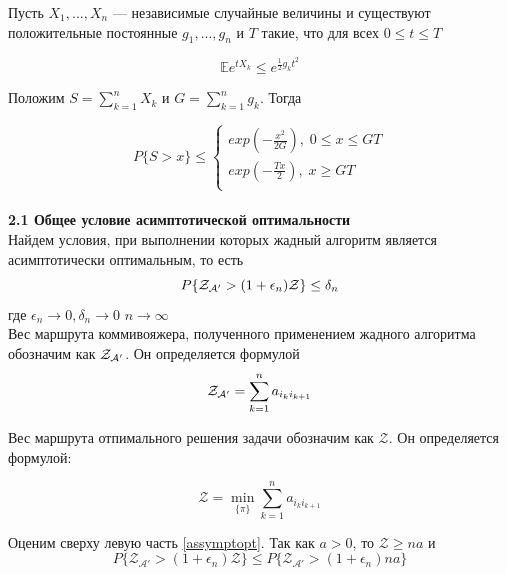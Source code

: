 \documentclass[a4paper, 14pt]{extarticle}
\begin{document}
Пусть $X_1,...,X_n$ — независимые случайные величины и
существуют положительные постоянные $g_1,...,g_n$ и $T$ такие, что для всех $0 \leq t \leq T$

\begin{equation}
\mathbb {E}e^{tX_k} \leq e^{\frac{1}{2} g_k t^{2}}
\end{equation}

Положим $S=\sum_{k=1}^{n} X_k $ и $G=\sum_{k=1}^{n} g_k $. Тогда

\begin{equation}
P\{S > x\} \leq 
\begin{cases}
   exp (-\frac{x^{2}}{2G}), \; 0 \leq x \leq GT\\
   exp (-\frac{Tx}{2}), \; x\geq GT \\
 \end{cases}
\end{equation}\\



\textbf{2.1 Общее условие асимптотической оптимальности}\\

Найдем условия, при выполнении которых жадный алгоритм является асимптотически оптимальным, то есть
\begin{equation}\label{assymptopt}
P\{\text{$\mathcal{Z_{A'}}$} > (1+\epsilon_n)\mathcal{Z}\}\leq \delta_n
\end{equation}
где $\epsilon_n \rightarrow 0, \delta_n \rightarrow 0$ $n \rightarrow \infty$\\

Вес маршрута коммивояжера, полученного применением жадного алгоритма обозначим как $\text{$\mathcal{Z_{A'}}$}$. Он определяется формулой
\begin{equation}
\text{$\mathcal{Z_{A'}}$} = \sum_{k=1}^n a_{i_k i_{k+1}}
\end{equation}

Вес маршрута отпимального решения задачи обозначим как $\mathcal{Z}$. Он определяется формулой:

\begin{equation}
\mathcal{Z} = \min_{\{ \pi \}} \sum_{k=1}^n a_{i_k i_{k+1}}
\end{equation}


Оценим сверху левую часть \eqref{assymptopt}. Так как $a>0$, то $\mathcal{Z} \geq na$ и 
\begin{equation}\label{4}
P\{\mathcal{Z_{A'}} > (1+\epsilon_n)\mathcal{Z}\}\leq P\{\mathcal{Z_{A'}} > (1+\epsilon_n)na\}
\end{equation}
\end{document}
